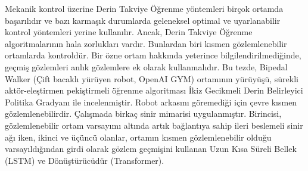 Mekanik kontrol üzerine Derin Takviye Öğrenme yöntemleri birçok ortamda başarılıdır ve bazı karmaşık durumlarda geleneksel optimal ve uyarlanabilir kontrol yöntemleri yerine kullanılır. Ancak, Derin Takviye Öğrenme algoritmalarının hala zorlukları vardır. Bunlardan biri kısmen gözlemlenebilir ortamlarda kontroldür. Bir özne ortam hakkında yeterince bilgilendirilmediğinde, geçmiş gözlemleri anlık gözlemlere ek olarak kullanmalıdır. Bu tezde, Bipedal Walker (Çift bacaklı yürüyen robot, OpenAI GYM) ortamının yürüyüşü, sürekli aktör-eleştirmen pekiştirmeli öğrenme algoritması İkiz Gecikmeli Derin Belirleyici Politika Gradyanı ile incelenmiştir. Robot arkasını göremediği için çevre kısmen gözlemlenebilirdir. Çalışmada birkaç sinir mimarisi uygulanmıştır. Birincisi, gözlemlenebilir ortam varsayımı altında artık bağlantıya sahip ileri beslemeli sinir ağı iken, ikinci ve üçüncü olanlar, ortamın kısmen gözlemlenebilir olduğu varsayıldığından girdi olarak gözlem geçmişini kullanan Uzun Kısa Süreli Bellek (LSTM) ve Dönüştürücüdür (Transformer).